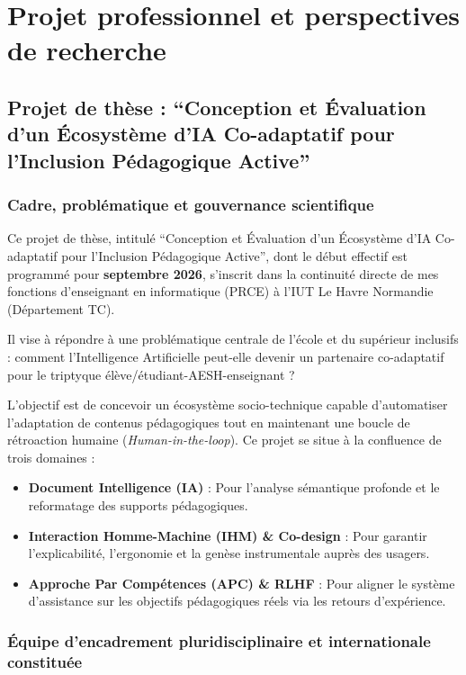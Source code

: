 \chapter{Projet professionnel et perspectives de recherche}

\section{Projet de thèse : \enquote{Conception et Évaluation d'un Écosystème d'IA Co-adaptatif pour l'Inclusion Pédagogique Active}}

\subsection{Cadre, problématique et gouvernance scientifique}

Ce projet de thèse, intitulé \enquote{Conception et Évaluation d'un Écosystème d'IA Co-adaptatif pour l'Inclusion Pédagogique Active}, dont le début effectif est programmé pour \textbf{septembre 2026}, s'inscrit dans la continuité directe de mes fonctions d'enseignant en informatique (PRCE) à l'IUT Le Havre Normandie (Département TC).

Il vise à répondre à une problématique centrale de l'école et du supérieur inclusifs : comment l'Intelligence Artificielle peut-elle devenir un partenaire co-adaptatif pour le triptyque élève/étudiant-AESH-enseignant ?

L'objectif est de concevoir un écosystème socio-technique capable d'automatiser l'adaptation de contenus pédagogiques tout en maintenant une boucle de rétroaction humaine (\textit{Human-in-the-loop}). Ce projet se situe à la confluence de trois domaines :
\begin{itemize}[leftmargin=*]
    \item \textbf{Document Intelligence (IA)} : Pour l'analyse sémantique profonde et le reformatage des supports pédagogiques.
    \item \textbf{Interaction Homme-Machine (IHM) \& Co-design} : Pour garantir l'explicabilité, l'ergonomie et la genèse instrumentale auprès des usagers.
    \item \textbf{Approche Par Compétences (APC) \& RLHF} : Pour aligner le système d'assistance sur les objectifs pédagogiques réels via les retours d'expérience.
\end{itemize}

\subsection{Équipe d'encadrement pluridisciplinaire et internationale constituée}


